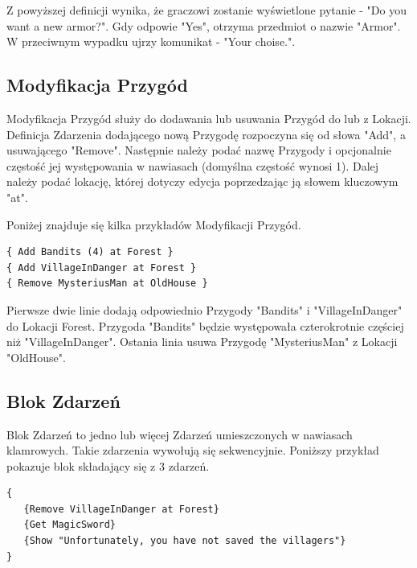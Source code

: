 \documentclass	{xmgr}
\begin{document}
Z powyższej definicji wynika, że graczowi zostanie wyświetlone pytanie - "Do you want a new armor?". Gdy odpowie "Yes", otrzyma przedmiot o nazwie "Armor". W przeciwnym wypadku ujrzy komunikat - "Your choise.".

\subsection{Modyfikacja Przygód}
Modyfikacja Przygód służy do dodawania lub usuwania Przygód do lub z Lokacji. Definicja Zdarzenia dodającego nową Przygodę rozpoczyna się od słowa "Add", a usuwającego "Remove". Następnie należy podać nazwę Przygody i opcjonalnie częstość jej występowania w nawiasach (domyślna częstość wynosi 1). Dalej należy podać lokację, której dotyczy edycja poprzedzając ją słowem kluczowym "at".

Poniżej znajduje się kilka przykładów Modyfikacji Przygód. 
\begin{lstlisting}
{ Add Bandits (4) at Forest }
{ Add VillageInDanger at Forest }
{ Remove MysteriusMan at OldHouse }
\end{lstlisting}
Pierwsze dwie linie dodają odpowiednio Przygody "Bandits" i "VillageInDanger" do Lokacji Forest. Przygoda "Bandits" będzie występowała czterokrotnie częściej niż "VillageInDanger". Ostania linia usuwa Przygodę "MysteriusMan" z Lokacji "OldHouse".

\subsection*{Blok Zdarzeń}
Blok Zdarzeń to jedno lub więcej Zdarzeń umieszczonych w nawiasach klamrowych. Takie zdarzenia wywołują się sekwencyjnie.
Poniższy przykład pokazuje blok składający się z 3 zdarzeń.
\begin{lstlisting}
{
   {Remove VillageInDanger at Forest}
   {Get MagicSword}
   {Show "Unfortunately, you have not saved the villagers"}
}
\end{lstlisting}
\end{document}
